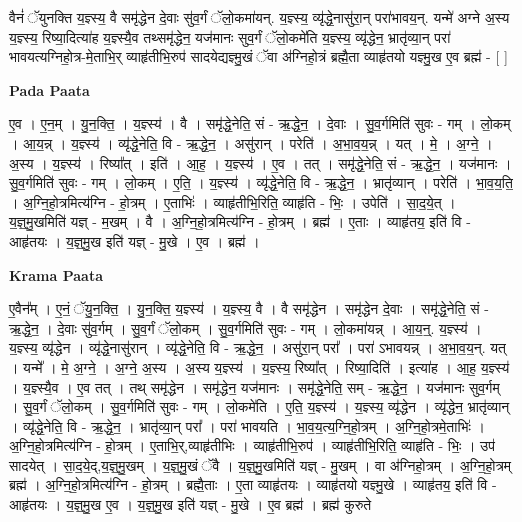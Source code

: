 \documentclass[17pt]{extarticle}
\begin{document}
वैनं॑ ॅयुनक्ति य॒ज्ञ्स्य॒ वै समृ॑द्धेन दे॒वाः सु॑व॒र्गं ॅलो॒कमा॑यन्. य॒ज्ञ्स्य॒ व्यृ॑द्धे॒नासु॑रा॒न् परा॑भावय॒न्. यन्मे॑ अग्ने अ॒स्य य॒ज्ञ्स्य॒ रिष्या॒दित्या॑ह य॒ज्ञ्स्यै॒व तथ्समृ॑द्धेन॒ यज॑मानः सुव॒र्गं ॅलो॒कमे॑ति य॒ज्ञ्स्य॒ व्यृ॑द्धेन॒ भ्रातृ॑व्या॒न् परा॑ भावयत्यग्निहो॒त्र-मे॒ताभि॒र् व्याहृ॑तीभि॒रुप॑ सादयेद्यज्ञ्मु॒खं ॅवा अ॑ग्निहो॒त्रं ब्रह्मै॒ता व्याहृ॑तयो यज्ञ्मु॒ख ए॒व ब्रह्म॑ - [ ] \newline

\textbf{Pada Paata} \newline

ए॒व । ए॒न॒म् । यु॒न॒क्ति॒ । य॒ज्ञ्स्य॑ । वै । समृ॑द्धे॒नेति॒ सं - ऋ॒द्धे॒न॒ । दे॒वाः । सु॒व॒र्गमिति॑ सुवः - गम् । लो॒कम् । आ॒य॒न्न् । य॒ज्ञ्स्य॑ । व्यृ॑द्धे॒नेति॒ वि - ऋ॒द्धे॒न॒ । असु॑रान् । परेति॑ । अ॒भा॒व॒य॒न्न् । यत् । मे॒ । अ॒ग्ने॒ । अ॒स्य । य॒ज्ञ्स्य॑ । रिष्या᳚त् । इति॑ । आ॒ह॒ । य॒ज्ञ्स्य॑ । ए॒व । तत् । समृ॑द्धे॒नेति॒ सं - ऋ॒द्धे॒न॒ । यज॑मानः । सु॒व॒र्गमिति॑ सुवः - गम् । लो॒कम् । ए॒ति॒ । य॒ज्ञ्स्य॑ । व्यृ॑द्धे॒नेति॒ वि - ऋ॒द्धे॒न॒ । भ्रातृ॑व्यान् । परेति॑ । भा॒व॒य॒ति॒ । अ॒ग्नि॒हो॒त्रमित्य॑ग्नि - हो॒त्रम् । ए॒ताभिः॑ । व्याहृ॑तीभि॒रिति॒ व्याहृ॑ति - भिः॒ । उपेति॑ । सा॒द॒ये॒त् । य॒ज्ञ्॒मु॒खमिति॑ यज्ञ् - म॒खम् । वै । अ॒ग्नि॒हो॒त्रमित्य॑ग्नि - हो॒त्रम् । ब्रह्म॑ । ए॒ताः । व्याहृ॑तय॒ इति॑ वि - आहृ॑तयः । य॒ज्ञ्॒मु॒ख इति॑ यज्ञ् - मु॒खे । ए॒व । ब्रह्म॑ ।  \newline


\textbf{Krama Paata} \newline

ए॒वैन᳚म् । ए॒नं॒ ॅयु॒न॒क्ति॒ । यु॒न॒क्ति॒ य॒ज्ञ्स्य॑ । य॒ज्ञ्स्य॒ वै । वै समृ॑द्धेन । समृ॑द्धेन दे॒वाः । समृ॑द्धे॒नेति॒ सं - ऋ॒द्धे॒न॒ । दे॒वाः सु॑व॒र्गम् । सु॒व॒र्गं ॅलो॒कम् । सु॒व॒र्गमिति॑ सुवः - गम् । लो॒कमा॑यन्न् । आ॒य॒न्॒. य॒ज्ञ्स्य॑ । य॒ज्ञ्स्य॒ व्यृ॑द्धेन । व्यृ॑द्धे॒नासु॑रान् । व्यृ॑द्धे॒नेति॒ वि - ऋ॒द्धे॒न॒ । असु॑रा॒न् परा᳚ । परा॑ ऽभावयन्न् । अ॒भा॒व॒य॒न्. यत् । यन्मे᳚ । मे॒ अ॒ग्ने॒ । अ॒ग्ने॒ अ॒स्य । अ॒स्य य॒ज्ञ्स्य॑ । य॒ज्ञ्स्य॒ रिष्या᳚त् । रिष्या॒दिति॑ । इत्या॑ह । आ॒ह॒ य॒ज्ञ्स्य॑ । य॒ज्ञ्स्यै॒व । ए॒व तत् । तथ् समृ॑द्धेन । समृ॑द्धेन॒ यज॑मानः । समृ॑द्धे॒नेति॒ सम् - ऋ॒द्धे॒न॒ । यज॑मानः सुव॒र्गम् । सु॒व॒र्गं ॅलो॒कम् । सु॒व॒र्गमिति॑ सुवः - गम् । लो॒कमे॑ति । ए॒ति॒ य॒ज्ञ्स्य॑ । य॒ज्ञ्स्य॒ व्यृ॑द्धेन । व्यृ॑द्धेन॒ भ्रातृ॑व्यान् । व्यृ॑द्धे॒नेति॒ वि - ऋ॒द्धे॒न॒ । भ्रातृ॑व्या॒न् परा᳚ । परा॑ भावयति । भा॒व॒य॒त्य॒ग्नि॒हो॒त्रम् । अ॒ग्नि॒हो॒त्रमे॒ताभिः॑ । अ॒ग्नि॒हो॒त्रमित्य॑ग्नि - हो॒त्रम् । ए॒ताभि॒र्,व्याहृ॑तीभिः । व्याहृ॑तीभि॒रुप॑ । व्याहृ॑तीभि॒रिति॒ व्याहृ॑ति - भिः॒ । उप॑ सादयेत् । सा॒द॒ये॒द्,य॒ज्ञ्॒मु॒खम् । य॒ज्ञ्॒मु॒खं ॅवै । य॒ज्ञ्॒मु॒खमिति॑ यज्ञ् - मु॒खम् । वा अ॑ग्निहो॒त्रम् । अ॒ग्नि॒हो॒त्रम् ब्रह्म॑ । अ॒ग्नि॒हो॒त्रमित्य॑ग्नि - हो॒त्रम् । ब्रह्मै॒ताः । ए॒ता व्याहृ॑तयः । व्याहृ॑तयो यज्ञ्मु॒खे । व्याहृ॑तय॒ इति॑ वि - आहृ॑तयः । य॒ज्ञ्॒मु॒ख ए॒व । य॒ज्ञ्॒मु॒ख इति॑ यज्ञ् - मु॒खे । ए॒व ब्रह्म॑ । ब्रह्म॑ कुरुते \newline
\end{document}
